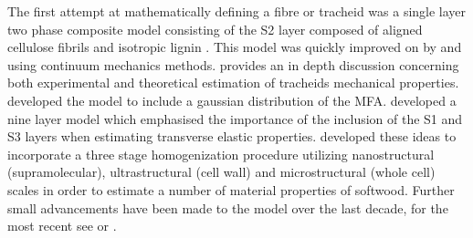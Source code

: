  The first attempt at mathematically defining a fibre or tracheid was a single layer two phase composite model consisting of the S2 layer composed of aligned cellulose fibrils and isotropic lignin \citep{Barber_1964}. This model was quickly improved on by \citet{mark1967cell} and \citet{Cave_1968} using continuum mechanics methods. \citet{mark1967cell} provides an in depth discussion concerning both experimental and theoretical estimation of tracheids mechanical properties. \citet{Cave_1968} developed the model to include a gaussian distribution of the MFA. \citet{bergander2002cell} developed a nine layer model which emphasised the importance of the inclusion of the S1 and S3 layers when estimating transverse elastic properties. \citet{harrington2002hierarchical} developed these ideas to incorporate a three stage homogenization procedure utilizing nanostructural (supramolecular), ultrastructural (cell wall) and microstructural (whole cell) scales in order to estimate a number of material properties of softwood. Further small advancements have been made to the model over the last decade, for the most recent see \citet{Sun_2014,Saavedra_Flores_2014,wang2013gradual} or \citet{faisal2013multiscale}.
 
 

 
